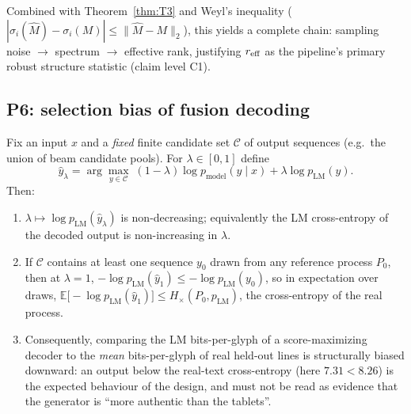 \begin{remark}
Combined with Theorem~\ref{thm:T3} and Weyl's inequality
($|\sigma_i(\hat M)-\sigma_i(M)|\le\|\hat M-M\|_2$), this yields a
complete chain: sampling noise $\to$ spectrum $\to$ effective rank,
justifying $r_{\mathrm{eff}}$ as the pipeline's primary robust structure
statistic (claim level C1).
\end{remark}

\subsection{P6: selection bias of fusion decoding}

\begin{proposition}
\label{prop:P6}
Fix an input $x$ and a \emph{fixed} finite candidate set
$\mathcal{C}$ of output sequences (e.g.\ the union of beam candidate
pools). For $\lambda\in[0,1]$ define
\[
\hat y_\lambda=\arg\max_{y\in\mathcal{C}}\;
(1-\lambda)\log p_{\mathrm{model}}(y\mid x)
+\lambda\log p_{\mathrm{LM}}(y).
\]
Then:
\begin{enumerate}[label=(\roman*),nosep]
\item $\lambda\mapsto\log p_{\mathrm{LM}}(\hat y_\lambda)$ is
non-decreasing; equivalently the LM cross-entropy of the decoded
output is non-increasing in $\lambda$.
\item If $\mathcal{C}$ contains at least one sequence $y_0$ drawn
from any reference process $P_0$, then at $\lambda=1$,
$-\log p_{\mathrm{LM}}(\hat y_1)\le-\log p_{\mathrm{LM}}(y_0)$, so in
expectation over draws,
$\mathbb{E}\bigl[-\log p_{\mathrm{LM}}(\hat y_1)\bigr]\le
H_{\times}(P_0,p_{\mathrm{LM}})$, the cross-entropy of the real
process.
\item Consequently, comparing the LM bits-per-glyph of a
score-maximizing decoder to the \emph{mean} bits-per-glyph of real
held-out lines is structurally biased downward: an output below the
real-text cross-entropy (here $7.31<8.26$) is the expected behaviour
of the design, and must not be read as evidence that the generator is
``more authentic than the tablets''.
\end{enumerate}
\end{proposition}

